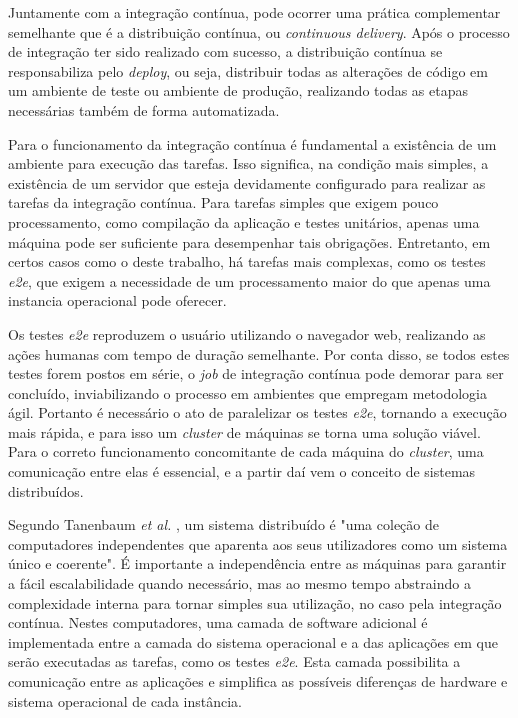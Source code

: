 Juntamente com a integração contínua, pode ocorrer uma prática complementar semelhante que é a distribuição contínua, ou \emph{continuous delivery}. Após o processo de integração ter sido realizado com sucesso, a distribuição contínua se responsabiliza pelo \emph{deploy}, ou seja, distribuir todas as alterações de código em um ambiente de teste ou ambiente de produção, realizando todas as etapas necessárias também de forma automatizada.

Para o funcionamento da integração contínua é fundamental a existência de um ambiente para execução das tarefas. Isso significa, na condição mais simples, a existência de um servidor que esteja devidamente configurado para realizar as tarefas da integração contínua. Para tarefas simples que exigem pouco processamento, como compilação da aplicação e testes unitários, apenas uma máquina pode ser suficiente para desempenhar tais obrigações. Entretanto, em certos casos como o deste trabalho, há tarefas mais complexas, como os testes \emph{e2e}, que exigem a necessidade de um processamento maior do que apenas uma instancia operacional
pode oferecer.

Os testes \emph{e2e} reproduzem o usuário utilizando o navegador web, realizando as ações humanas com tempo de duração semelhante. Por conta disso, se todos estes testes forem postos em série, o \emph{job} de integração contínua pode demorar para ser concluído, inviabilizando o processo em ambientes que empregam metodologia ágil. Portanto é necessário o ato de paralelizar os testes \emph{e2e}, tornando a execução mais rápida, e para isso um \emph{cluster} de máquinas se torna uma solução viável. Para o correto funcionamento concomitante de cada máquina do \emph{cluster}, uma comunicação entre elas é essencial, e a partir daí vem o conceito de sistemas distribuídos.

Segundo Tanenbaum \emph{et al.} \cite{tanenbaum}, um sistema distribuído é "uma coleção de computadores independentes que aparenta aos seus utilizadores como um sistema único e coerente". É importante a independência entre as máquinas para garantir a fácil escalabilidade quando necessário, mas ao mesmo tempo abstraindo a complexidade interna para tornar simples sua utilização, no caso pela integração contínua. Nestes computadores, uma camada de software adicional é implementada entre a camada do sistema operacional e a das aplicações em que serão executadas as tarefas, como os testes \emph{e2e}. Esta camada possibilita a comunicação entre as aplicações e simplifica as possíveis diferenças de hardware e sistema operacional de cada instância.

